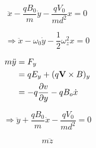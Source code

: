 \documentclass[english,notitlepage,reprint,nofootinbib]{revtex4-1}  %
\begin{document}
\begin{equation*}
    \ddot{x} - \frac{q B_0}{m} \dot{y} - \frac{q V_0}{m d^2} x = 0
\end{equation*}

\begin{equation*}
    \Rightarrow \ddot{x} - \omega_0 \dot{y} - \frac{1}{2} \omega^2_z x = 0
\end{equation*}

\begin{align*}
    m \ddot{y} &= F_y \\
    &= q E_y + (q \vectorbold{V} \times B)_y \\
    &= - q \frac{\partial v}{\partial y} - q B_o \dot{x}
\end{align*}

\begin{equation*}
    \Rightarrow \ddot{y} + \frac{q B_0}{m} \dot{x} - \frac{q V_0}{m d^2} = 0
\end{equation*}

\begin{equation*}
    m \ddot{z}
\end{equation*}
\end{document}
